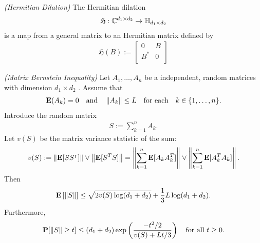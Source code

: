 \begin{definition}
  \emph{(Hermitian Dilation)}
  The Hermitian dilation
  \begin{gather*}
    \mathfrak{H} : \mathbb{C}^{d_1 \times d_2} \to \mathbb{H}_{d_1 \times d_2}
  \end{gather*}
  is a map from a general matrix to an Hermitian matrix defined by
  \begin{gather}
    \label{ rmineq_hermitian_dilation } 
    \mathfrak{H}(B)
    :=
    \begin{bmatrix}
      0   & B \\
      B^* & 0 \\
    \end{bmatrix}
  \end{gather}
\end{definition}




\begin{theorem}
  \emph{(Matrix Bernstein Inequality)}
  \label{rmineq_bernstein}
  Let $A_1, \ldots, A_n$ be a independent, random matrices with dimension 
  $d_1 \times d_2$
  . Assume that
    \begin{gather}
      \label{rmineq_bernstein_cond_1}
      \mathbf{E}(A_k)=0\quad\text{and}\quad\left\lVert A_k\right\rVert\le L \quad \text{for each}\quad  k\in \{1,\ldots,n\}.
    \end{gather}
    Introduce the random matrix
      \begin{gather*}
        S:=\sum_{k=1}^n A_k.
      \end{gather*}
    Let $v(S)$ be the matrix variance statistic of the sum:
      \begin{align}
        \label{rmineq_bernstein_cond_2}
        v(S):= \left\lVert\mathbf{E}[SS^\intercal ]\right\rVert \lor \left\lVert\mathbf{E}[S^T S]\right\rVert 
             = \left\lVert\sum_{k=1}^n\mathbf{E}[A_kA_k^T]\right\rVert \lor \left\lVert\sum_{k=1}^n\mathbf{E}[A_k^T A_k]\right\rVert .
      \end{align}
    Then
      \begin{align}
        \label{rmineq_bernstein_expectation_bound}
        \mathbf{E} \left[ \left\lVert S\right\rVert \right]\le \sqrt{2v(S)\log(d_1+d_2)} + \frac{1}{3}L\log(d_1+d_2).
      \end{align}
    Furthermore, 
      \begin{gather}
        \label{rmineq_bernstein_probability_bound}
        \mathbf{P}[\left\lVert S\right\rVert\ge t]\le(d_1+d_2)\exp\left(\frac{-t^2/2}{v(S)+Lt/3} \right)
        \quad
        \text{for all $t \ge 0$}
        .
      \end{gather}
\end{theorem}

